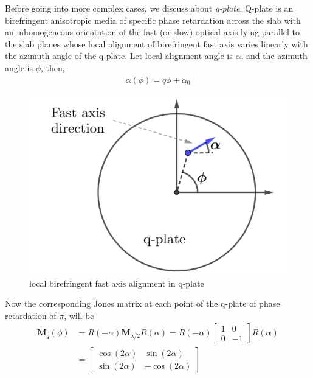 \documentclass[11pt,a4paper]{article}
\numberwithin{equation}{section}
\begin{document}
Before going into more complex cases, we discuss about \textit{q-plate}. Q-plate is an birefringent anisotropic media of specific phase retardation across the slab with an inhomogeneous orientation of the fast (or slow) optical axis lying parallel to the slab planes whose local alignment of birefringent fast axis varies linearly with the azimuth angle of the q-plate. \cite{marrucci 06} Let local alignment angle is $\alpha$, and the azimuth angle is $\phi$, then,
\begin{align}
	\alpha(\phi)=q\phi+\alpha_0
\end{align}
\begin{figure}[H]
\centering
\includegraphics[width=0.4\linewidth]{q-plate}
\caption{local birefringent fast axis alignment in q-plate}
\label{fig:q-plate}
\end{figure}

Now the corresponding Jones matrix at each point of the q-plate of phase retardation of $\pi$, will be \cite{marrucci 06}
\begin{align}
	\boldsymbol{M}_q(\phi)&=R(-\alpha)\boldsymbol{M}_{\lambda/2}R(\alpha) 
	=R(-\alpha)
	\begin{bmatrix}
		1 & 0\\
		0 & -1
	\end{bmatrix}
	R(\alpha)\nonumber\\
	 &=\begin{bmatrix}
		\cos(2\alpha) & \sin(2\alpha)\\
		\sin(2\alpha) & -\cos(2\alpha)
	\end{bmatrix}
\end{align}
\end{document}
